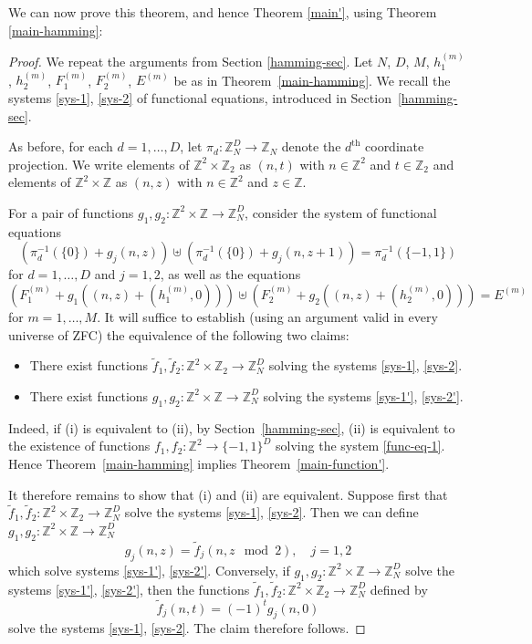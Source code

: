 \documentclass[reqno,a4paper,12pt]{amsart}
\numberwithin{equation}{section}
\numberwithin{figure}{section}
\def\Z{\mathbb{Z}}
\theoremstyle{plain}
\theoremstyle{definition}
\newcommand{\thmref}[1]{Theorem~\ref{#1}}
\newcommand{\secref}[1]{Section~\ref{#1}}
\begin{document}
We can now prove this theorem, and hence Theorem \ref{main'}, using Theorem \ref{main-hamming}:

\begin{proof}  We repeat the arguments from Section \ref{hamming-sec}.  Let $N$, $D$, $M$, $h_1^{(m)}$, $h_2^{(m)}$, $F_1^{(m)}$, $F_2^{(m)}$, $E^{(m)}$ be as in  \thmref{main-hamming}.  We recall the systems \eqref{sys-1}, \eqref{sys-2} of functional equations, introduced in \secref{hamming-sec}.

As before, for each $d=1,\dots,D$, let $\pi_d \colon \Z_N^D \to \Z_N$ denote the $d^{\mathrm{th}}$ coordinate projection.
We write elements of $\Z^2 \times \Z_2$ as $(n,t)$ with $n \in \Z^2$ and $t \in \Z_2$ and   elements of $\Z^2 \times \Z$ as $(n,z)$ with $n \in \Z^2$ and $z \in \Z$.

For a pair of functions $ g_1, g_2 \colon \Z^2 \times \Z \to \Z_N^D$, consider the system of functional equations
\begin{equation}\label{sys-1'}
\left(\pi_d^{-1}(\{0\}) +  g_j(n,z)\right) \uplus 
\left(\pi_d^{-1}(\{0\}) +  g_j(n,z+1)\right) = \pi_d^{-1}(\{-1,1\}) 
\end{equation}
for $d=1,\dots,D$ and $j=1,2$, as well as the equations
\begin{equation}\label{sys-2'}
\left(F_1^{(m)} +  g_1((n,z)+(h_1^{(m)},0))\right) \uplus
\left(F_2^{(m)} +  g_2((n,z)+(h_2^{(m)},0))\right) = E^{(m)}
\end{equation}
for $m=1,\dots,M$.  It will suffice to establish (using an argument valid in every universe of ZFC) the equivalence of the following two claims:

\begin{itemize}
\item[(i)]  There exist functions $\tilde f_1, \tilde f_2 \colon \Z^2 \times \Z_2 \to \Z_N^D$ solving the systems \eqref{sys-1}, \eqref{sys-2}.
\item[(ii)] There exist functions $ g_1,  g_2 \colon \Z^2 \times \Z \to \Z_N^D$ solving the systems \eqref{sys-1'}, \eqref{sys-2'}.
 \end{itemize}
 
 Indeed, if (i) is equivalent to (ii), by \secref{hamming-sec}, (ii) is equivalent to the existence of functions $f_1,f_2\colon \Z^2\to \{-1,1\}^D$ solving the system \eqref{func-eq-1}. Hence \thmref{main-hamming} implies \thmref{main-function'}.
 
 It  therefore remains to show that (i) and (ii) are equivalent.
 Suppose first that $\tilde f_1, \tilde f_2 \colon \Z^2 \times \Z_2 \to \Z_N^D$ solve the systems \eqref{sys-1}, \eqref{sys-2}. Then we can define $ g_1,  g_2 \colon \Z^2 \times \Z \to \Z_N^D$
 \begin{equation*}
     g_j(n,z)=\tilde f_j(n, z\mod 2),\quad j=1,2
 \end{equation*}
 which solve systems \eqref{sys-1'}, \eqref{sys-2'}.
 Conversely, if  $ g_1,  g_2 \colon \Z^2 \times \Z \to \Z_N^D$ solve the systems \eqref{sys-1'}, \eqref{sys-2'}, then the functions $\tilde f_1, \tilde f_2 \colon \Z^2 \times \Z_2 \to \Z_N^D$ defined by
$$
\tilde f_j(n,t) = (-1)^t g_j(n,0)
$$
solve the systems \eqref{sys-1}, \eqref{sys-2}. The claim  therefore follows.
\end{proof}
\end{document}

